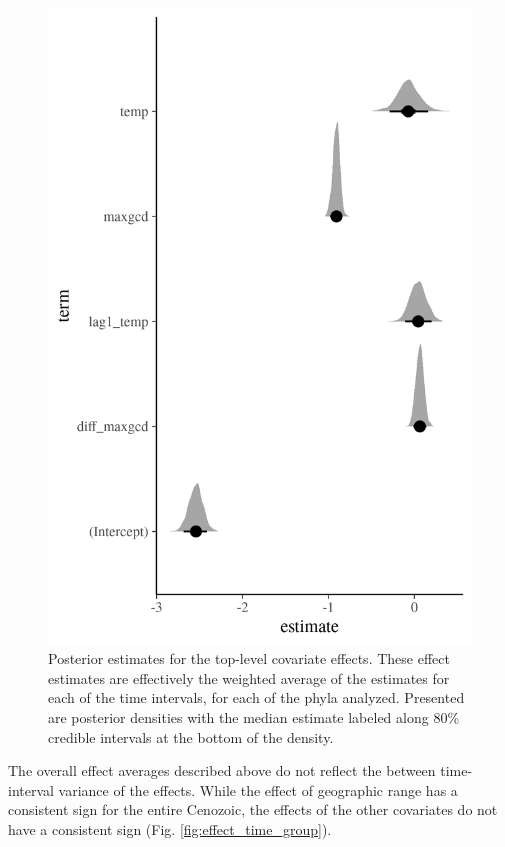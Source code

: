 \documentclass[12pt,letterpaper]{article}
\begin{document}
\begin{figure}[ht]
  \centering
  \includegraphics[width=\textwidth,height=0.5\textheight,keepaspectratio=true]{figure/effect_est}
  \caption{Posterior estimates for the top-level covariate effects. These effect estimates are effectively the weighted average of the estimates for each of the time intervals, for each of the phyla analyzed. Presented are posterior densities with the median estimate labeled along 80\% credible intervals at the bottom of the density.}
  \label{fig:effect_est}
\end{figure}


The overall effect averages described above do not reflect the between time-interval variance of the effects. While the effect of geographic range has a consistent sign for the entire Cenozoic, the effects of the other covariates do not have a consistent sign (Fig. \ref{fig:effect_time_group}). 
\end{document}
